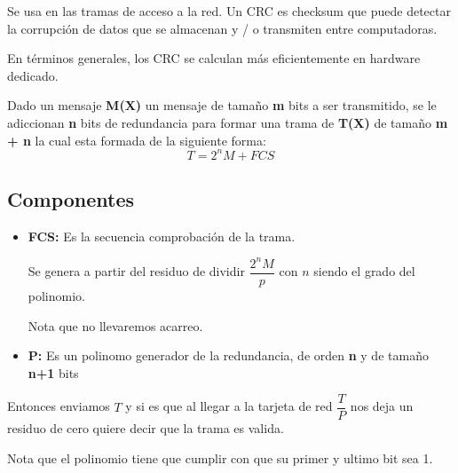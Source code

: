 \documentclass[12pt, fleqn]{report}                             %
\theoremstyle{break}                                            %
\begin{document}
                Se usa en las tramas de acceso a la red.
                Un CRC es checksum que puede detectar la corrupción de datos que se
                almacenan y / o transmiten entre computadoras. 

                En términos generales, los CRC se calculan más eficientemente en hardware dedicado.


                Dado un mensaje \textbf{M(X)} un mensaje de tamaño \textbf{m} bits a ser transmitido,
                se le adiccionan \textbf{n} bits de redundancia para formar una trama de \textbf{T(X)}
                de tamaño \textbf{m + n} la cual esta formada de la siguiente forma:
                \begin{equation*}
                    T = 2^n M + FCS
                \end{equation*}

                \subsection{Componentes}
                    
                    \begin{itemize}
                        \item 
                            \textbf{FCS:} Es la secuencia comprobación de la trama. 

                            Se genera a partir del residuo de dividir $\dfrac{2^n M}{p}$ con $n$ siendo
                            el grado del polinomio. 

                            Nota que no llevaremos acarreo.

                        \item
                            \textbf{P:} Es un polinomo generador de la redundancia, de orden \textbf{n}
                            y de tamaño \textbf{n+1} bits

                    \end{itemize}

                    Entonces enviamos $T$ y si es que al llegar a la tarjeta de red $\dfrac{T}{P}$ nos deja
                    un residuo de cero quiere decir que la trama es valida.

                    Nota que el polinomio tiene que cumplir con que su primer y ultimo bit sea 1.
\end{document}
